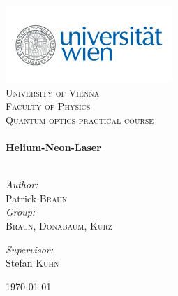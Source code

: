 \begin{titlepage}
\begin{center}

\includegraphics[scale=0.75]{./unilogo}~\\[2cm]

\textsc{\LARGE University of Vienna }\\[0.5cm]
\textsc{\LARGE Faculty of Physics}\\[1.5cm]
\textsc{\Large Quantum optics practical course}\\[0.5cm]

\HRule \\[0.4cm]
{ \huge \bfseries Helium-Neon-Laser}\\[0.4cm]

\HRule \\[1.5cm]

\begin{minipage}{0.4\textwidth}
\begin{flushleft} \large
\emph{Author:}\\
Patrick \textsc{Braun}\\
\emph{Group:}\\
\textsc{Braun, Donabaum, Kurz}\\
\end{flushleft}
\end{minipage}
\begin{minipage}{0.4\textwidth}
\begin{flushright} \large
\emph{Supervisor:} \\
Stefan \textsc{Kuhn}
\end{flushright}
\end{minipage}

\vfill

{\large \today}

\end{center}
\end{titlepage}